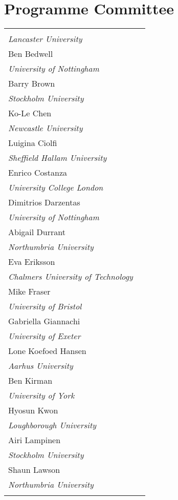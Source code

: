 \documentclass[a4paper,oneside]{memoir}
\begin{document}
\newpage\section{Programme Committee}
\begin{table}[h]
\begin{tabularx}{\textwidth}{@{}XX@{}}
    \begin{tabular}[t]{@{}l@{}}
        Oliver Bates\\\textit{Lancaster University}\\[.15cm]
        Ben Bedwell\\\textit{University of Nottingham}\\[.15cm]
        Barry Brown\\\textit{Stockholm University}\\[.15cm]
        Ko-Le Chen\\\textit{Newcastle University}\\[.15cm]
        Luigina Ciolfi\\\textit{Sheffield Hallam University}\\[.15cm]
        Enrico Costanza\\\textit{University College London}\\[.15cm]
        Dimitrios Darzentas\\\textit{University of Nottingham}\\[.15cm]
        Abigail Durrant\\\textit{Northumbria University}\\[.15cm]
        Eva Eriksson\\\textit{Chalmers University of Technology}\\[.15cm]
        Mike Fraser\\\textit{University of Bristol}\\[.15cm]
        Gabriella Giannachi\\\textit{University of Exeter}\\[.15cm]
        Lone Koefoed Hansen\\\textit{Aarhus University}\\[.15cm]
        Ben Kirman\\\textit{University of York}\\[.15cm]
        Hyosun Kwon\\\textit{Loughborough University}\\[.15cm]
        Airi Lampinen\\\textit{Stockholm University}\\[.15cm]
        Shaun Lawson\\\textit{Northumbria University}\\[.15cm]

\end{tabular}
\end{tabularx}
\end{table}
\end{document}
